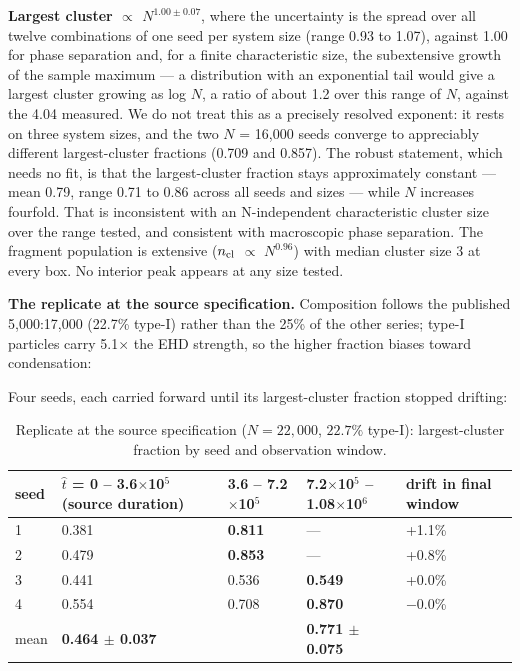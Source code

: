 \documentclass[aps,pre,preprint,superscriptaddress,nofootinbib,longbibliography]{revtex4-2}
\begin{document}
\textbf{Largest cluster $\propto$ $N^{1.00\pm0.07}$}, where the uncertainty is the spread over all twelve combinations of one seed per system size (range 0.93 to 1.07), against 1.00 for phase separation and, for a finite characteristic size, the subextensive growth of the sample maximum --- a distribution with an exponential tail would give a largest cluster growing as log $N$, a ratio of about 1.2 over this range of $N$, against the 4.04 measured. We do not treat this as a precisely resolved exponent: it rests on three system sizes, and the two $N$ = 16,000 seeds converge to appreciably different largest-cluster fractions (0.709 and 0.857). The robust statement, which needs no fit, is that the largest-cluster fraction stays approximately constant --- mean 0.79, range 0.71 to 0.86 across all seeds and sizes --- while $N$ increases fourfold. That is inconsistent with an N-independent characteristic cluster size over the range tested, and consistent with macroscopic phase separation. The fragment population is extensive ($n_{\rm cl}$ $\propto$ $N^{0.96}$) with median cluster size 3 at every box. No interior peak appears at any size tested.

\textbf{The replicate at the source specification.} Composition follows the published 5,000:17,000 (22.7\% type-I) rather than the 25\% of the other series; type-I particles carry 5.1$\times$ the EHD strength, so the higher fraction biases toward condensation:

Four seeds, each carried forward until its largest-cluster fraction stopped drifting:

\begin{table}[htbp]
\caption{Replicate at the source specification ($N=22{,}000$, $22.7\%$ type-I): largest-cluster fraction by seed and observation window.}
\label{tab:8}
\begin{ruledtabular}
\begin{tabular}{p{1.02cm}p{4.05cm}p{2.60cm}p{3.34cm}p{2.34cm}}
\raggedright
seed & $\hat{t}$ = 0 -- 3.6$\times$10$^{5}$ (\textbf{source duration}) & 3.6 -- 7.2$\times$10$^{5}$ & 7.2$\times$10$^{5}$ -- 1.08$\times$10$^{6}$ & drift in final window \\
\hline
1 & 0.381 & \textbf{0.811} & --- & +1.1\% \\
2 & 0.479 & \textbf{0.853} & --- & +0.8\% \\
3 & 0.441 & 0.536 & \textbf{0.549} & +0.0\% \\
4 & 0.554 & 0.708 & \textbf{0.870} & $-$0.0\% \\
mean & \textbf{0.464 $\pm$ 0.037} &  & \textbf{0.771 $\pm$ 0.075} &  \\
\end{tabular}
\end{ruledtabular}
\end{table}
\end{document}
